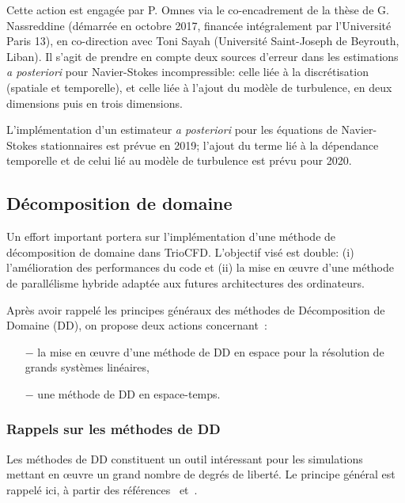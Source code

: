 \begin{rque}
 
Cette action est engag\'ee par P. Omnes via le co-encadrement de la th\`ese de G. Nassreddine (d\'emarr\'ee en octobre 2017, financ\'ee int\'egralement par l'Universit\'e Paris 13), en co-direction avec Toni Sayah (Universit\'e Saint-Joseph de Beyrouth, Liban).
Il s'agit de prendre en compte deux sources d'erreur dans les estimations {\it a posteriori} pour Navier-Stokes incompressible: celle li\'ee \`a la discr\'etisation (spatiale et temporelle), et celle li\'ee \`a l'ajout du mod\`ele de turbulence, en deux dimensions puis en trois dimensions.
\end{rque} 
\begin{rque}
 
L'impl\'ementation d'un estimateur {\it a posteriori} pour les \'equations de Navier-Stokes stationnaires est pr\'evue en 2019; l'ajout du terme li\'e \`a la d\'ependance temporelle et de celui li\'e au mod\`ele de turbulence est pr\'evu pour 2020.
\end{rque} 



\subsection{D\'ecomposition de domaine}
\label{section-DD}
Un effort important portera sur l'impl\'ementation d'une m\'ethode de d\'ecomposition de domaine dans TrioCFD. L'objectif vis\'e est double: (i) l'am\'elioration des performances du code et (ii) la mise en {\oe}uvre d'une m\'ethode de parall\'elisme hybride adapt\'ee aux futures architectures des ordinateurs.

Apr\`es avoir rappel\'e les principes g\'en\'eraux des m\'ethodes de D\'ecomposition de Domaine (DD), on propose deux actions concernant~:

\begin{itemize}
\item[$-$]
la mise en {\oe}uvre d'une m\'ethode de DD en espace pour la r\'esolution de grands syst\`emes lin\'eaires, 

\item[$-$]
une m\'ethode de DD en espace-temps.
\end{itemize}

\subsubsection{Rappels sur les m\'ethodes de DD}
Les m\'ethodes de DD constituent un outil int\'eressant pour les simulations mettant en {\oe}uvre un grand nombre de degr\'es de libert\'e. Le principe g\'en\'eral est rappel\'e ici, \`a partir des r\'ef\'erences~\cite{Belliard} et~\cite{Ciobanu}.

